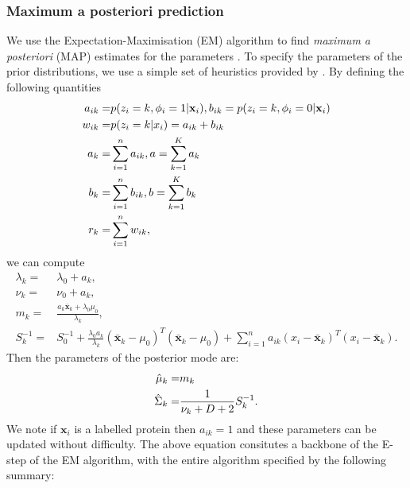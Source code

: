 \documentclass[12pt,english]{article}\usepackage[]{graphicx}\usepackage[]{color}
\begin{document}
\subsubsection{Maximum a posteriori prediction}
We use the Expectation-Maximisation (EM) algorithm \citep{EM:1977} to find {\em maximum a posteriori} (MAP) estimates for the parameters \cite[see, for example,][]{Murphy:2012}. To specify the parameters of the prior distributions, we use a simple set of heuristics provided
by \cite{Fraley:2007}. By defining the following quantities
\begin{equation}\label{equation::estepfinal}
\begin{split}
a_{ik} = & p(z_i = k, \phi_i = 1|{\bf x}_i), b_{ik} = p(z_i = k, \phi_i = 0|{\bf x}_i) \\
w_{ik} = & p(z_i = k|x_i) = a_{ik} + b_{ik}\\
a_k = & \sum_{i=1}^{n}a_{ik}, a = \sum_{k=1}^{K}a_k \\
b_k = & \sum_{i=1}^{n}b_{ik}, b = \sum_{k=1}^{K}b_k \\
r_k = & \sum_{i=1}^{n}w_{ik},
\end{split}
\end{equation}
we can compute
\begin{equation}\label{equation::Posterior}
\begin{split}
\lambda_k = &\lambda_0 + a_k, \\
\nu_k = & \nu_0 + a_k, \\
m_k = & \frac{a_k\bar{\boldsymbol{x}}_k + \lambda_0\mu_0}{\lambda_k},\\
S_k^{-1}  = & S_0^{-1} + \frac{\lambda_0 a_k}{\lambda_k}(\bar{\boldsymbol{x}}_k - \mu_0)^{T} (\bar{\boldsymbol{x}}_k - \mu_0) + \sum_{i=1}^{n} a_{ik}(x_i -\bar{\boldsymbol{x}}_k)^{T}(x_i -\bar{\boldsymbol{x}}_k).
\end{split}
\end{equation}
Then the parameters of the posterior mode are:
\begin{equation}\label{equation::MAP}
\begin{split}
\hat{{\bf\mu}}_k = &m_k \\
\hat{\Sigma}_k = &\frac{1}{\nu_k + D + 2}S_k^{-1}.
\end{split}
\end{equation}
We note if $\boldsymbol{x}_i$ is a labelled protein then $a_{ik} = 1$ and these parameters can be updated without difficulty.
The above equation consitutes a backbone of the E-step of the EM algorithm, with the entire algorithm specified by the following summary:
\end{document}
